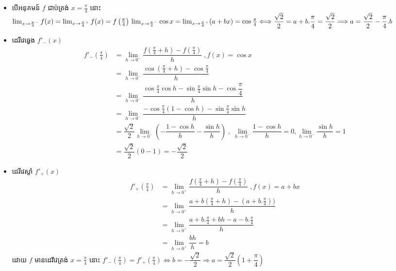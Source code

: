 \documentclass[12pt,fleqn]{book} %
\begin{document}
\begin{itemize}
\item បើអនុគមន៍ $f$ ជាប់ត្រង់ $x=\frac{\pi}{4}$ នោះ $\lim_{x\to \frac{\pi}{4}^-}f(x)=\lim_{x\to \frac{\pi}{4}^+}f(x)=f\left(\frac{\pi}{4}\right)\\
\lim_{x\to \frac{\pi}{4}^-}\cos x=\lim_{x\to \frac{\pi}{4}^+}(a+bx)=\cos \frac{\pi}{4}\Longleftrightarrow \dfrac{\sqrt{2}}{2}=a+b.\dfrac{\pi}{4}=\dfrac{\sqrt{2}}{2}\Longrightarrow a=\dfrac{\sqrt{2}}{2}-\dfrac{\pi}{4}.b$
\item ដេរីវេឆ្វេង $f'_-(x)$
\begin{align*}
f'_-\left(\frac{\pi}{4}\right)&=\lim_{h\to 0^-}\dfrac{f(\frac{\pi}{4}+h)-f\left(\frac{\pi}{4}\right)}{h}\;, f(x)=\cos x\\
&=\lim_{h\to 0^-}\dfrac{\cos (\frac{\pi}{4}+h)-\cos \frac{\pi}{4}}{h}\\
&=\lim_{h\to 0^-}\dfrac{\cos \frac{\pi}{4}\cos h-\sin \frac{\pi}{4}\sin h-\cos \dfrac{\pi}{4}}{h}\\
&=\lim_{h\to 0^-}\dfrac{-\cos \frac{\pi}{4}(1-\cos h)-\sin \frac{\pi}{4}\sin h}{h}\\
&=\dfrac{\sqrt{2}}{2}\lim_{h\to 0^-}\left(-\dfrac{1-\cos h}{h}-\dfrac{\sin h}{h} \right) \; ,\; \lim_{h\to 0^-}\dfrac{1-\cos h}{h}=0 , \lim_{h\to 0^-}\dfrac{\sin h}{h}=1\\
&=\dfrac{\sqrt{2}}{2}(0-1)=-\dfrac{\sqrt{2}}{2}
\end{align*}
\item ដេរីវេស្តាំ $f'_+(x)$ 
\begin{align*}
f'_+\left(\frac{\pi}{4}\right)&=\lim_{h\to 0^+}\dfrac{f(\frac{\pi}{4}+h)-f\left(\frac{\pi}{4}\right)}{h}\;, f(x)=a+bx\\
&=\lim_{h\to 0^+}\dfrac{a+b(\frac{\pi}{4}+h)-(a+b.\frac{\pi}{4}))}{h}\\
&=\lim_{h\to 0^+}\dfrac{a+b.\frac{\pi}{4}+bh-a-b.\frac{\pi}{4}}{h}\\
&=\lim_{h\to 0^+}\dfrac{bh}{h}=b
\end{align*}
ដោយ $f$ មានដេរីវេត្រង់ $x=\frac{\pi}{4}$ នោះ $f'_-(\frac{\pi}{4})=f'_+(\frac{\pi}{4})\Longleftrightarrow b=-\dfrac{\sqrt{2}}{2}\Longrightarrow a=\dfrac{\sqrt{2}}{2}\left(1+\dfrac{\pi}{4}\right)$
\end{itemize}
\end{document}
